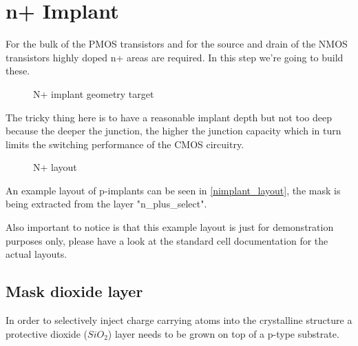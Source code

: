 \section{n+ Implant}\label{nimplant}
For the bulk of the PMOS transistors and for the source and drain of the NMOS transistors highly doped  n+ areas are required.
In this step we're going to build these.

\begin{figure}[H]
	\centering
	\begin{tikzpicture}[node distance = 3cm, auto, thick,scale=\CrossAndTopSectionBig, every node/.style={transform shape}]
		
	\end{tikzpicture}
	\begin{tikzpicture}[node distance = 3cm, auto, thick,scale=\CrossAndTopSectionBig, every node/.style={transform shape}]
		
	\end{tikzpicture}
	\caption{N+ implant geometry target}
\end{figure}

The tricky thing here is to have a reasonable implant depth but not too deep because the deeper the junction, the higher the junction capacity which in turn limits the switching performance of the CMOS circuitry.

\begin{figure}[H]
	\centering
	\begin{tikzpicture}[node distance =1cm, auto, thick,scale=\VLSILayout, every node/.style={transform shape}]
		
	\end{tikzpicture}
	\caption{N+ layout}
	\label{nimplant_layout}
\end{figure}

An example layout of p-implants can be seen in \autoref{nimplant_layout}, the mask is being extracted from the layer "n\_plus\_select".

Also important to notice is that this example layout is just for demonstration purposes only, please have a look at the standard cell documentation for the actual layouts. 

\newpage

\subsection{Mask dioxide layer}

In order to selectively inject charge carrying atoms into the crystalline structure a protective dioxide ($SiO_2$) layer needs to be grown on top of a p-type substrate.

